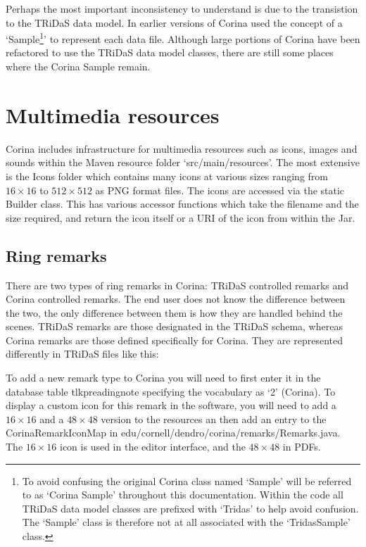 Perhaps the most important inconsistency to understand is due to the transistion to the TRiDaS data model.  In earlier versions of Corina used the concept of a `Sample\footnote{To avoid confusing the original Corina class named `Sample' will be referred to as `Corina Sample' throughout this documentation.  Within the code all TRiDaS data model classes are prefixed with `Tridas' to help avoid confusion.  The `Sample' class is therefore not at all associated with the `TridasSample' class.}' to represent each data file.  Although large portions of Corina have been refactored to use the TRiDaS data model classes, there are still some places where the Corina Sample remain.  

\section{Multimedia resources}
Corina includes infrastructure for multimedia resources such as icons, images and sounds within the Maven resource folder `src/main/resources'.  The most extensive is the Icons folder which contains many icons at various sizes ranging from $16\times16$ to $512\times512$ as PNG format files.  The icons are accessed via the static Builder class.  This has various accessor functions which take the filename and the size required, and return the icon itself or a URI of the icon from within the Jar.

\subsection{Ring remarks}
There are two types of ring remarks in Corina: TRiDaS controlled remarks and Corina controlled remarks.  The end user does not know the difference between the two, the only difference between them is how they are handled behind the scenes.  TRiDaS remarks are those designated in the TRiDaS schema, whereas Corina remarks are those defined specifically for Corina.  They are represented differently in TRiDaS files like this: 

To add a new remark type to Corina you will need to first enter it in the database table tlkpreadingnote specifying the vocabulary as `2' (Corina).  To display a custom icon for this remark in the software, you will need to add a $16\times16$ and a $48\times48$ version to the resources an then add an entry to the CorinaRemarkIconMap in edu/cornell/dendro/corina/remarks/Remarks.java.  The $16\times16$ icon is used in the editor interface, and the $48\times48$ in PDFs.

